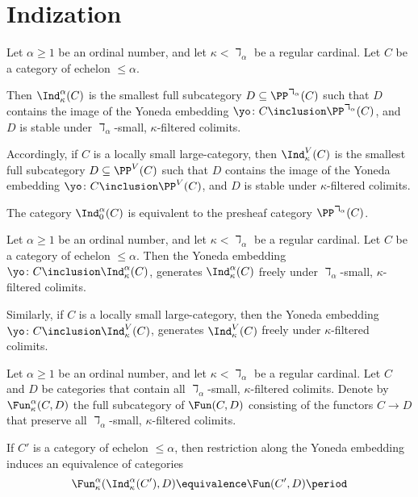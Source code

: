 
\section{Indization}%
\label{sec:indization}

\begin{definition}
	Let $ \alpha \geq 1 $ be an ordinal number, and
	let $ \kappa < \daleth_{\alpha} $ be a regular cardinal.
	Let $ C $ be a category of echelon $ \leq \alpha $.

	Then $ \Ind_{\kappa}^{\alpha}(C) $ is
	the smallest full subcategory $ D \subseteq \PP^{\daleth_{\alpha}}(C) $
	such that $ D $ contains the image
	of the Yoneda embedding
	$ \yo \colon C \inclusion \PP^{\daleth_{\alpha}}(C) $,
	and $ D $ is stable under
	$ \daleth_{\alpha} $-small, $ \kappa $-filtered colimits.

	Accordingly, if $ C $ is a locally small large-category,
	then $ \Ind_{\kappa}^V(C) $ is
	the smallest full subcategory $ D \subseteq \PP^V(C) $
	such that $ D $ contains the image
	of the Yoneda embedding
	$ \yo \colon C \inclusion \PP^V(C) $,
	and $ D $ is stable under $ \kappa $-filtered colimits.
\end{definition}

\begin{eg}
	The category $ \Ind_{0}^{\alpha}(C) $ is 
	equivalent to the presheaf category
	$ \PP^{\daleth_{\alpha}}(C) $.
\end{eg}

\begin{proposition}
	Let $ \alpha \geq 1 $ be an ordinal number, and
	let $ \kappa < \daleth_{\alpha} $ be a regular cardinal.
	Let $ C $ be a category of echelon $ \leq \alpha $.
	Then the Yoneda embedding
	$ \yo \colon C \inclusion \Ind_{\kappa}^{\alpha}(C) $,
	generates $ \Ind_{\kappa}^{\alpha}(C) $ freely under
	$ \daleth_{\alpha} $-small, $ \kappa $-filtered colimits.

	Similarly, if $ C $ is a locally small large-category,
	then the Yoneda embedding
	$ \yo \colon C \inclusion \Ind_{\kappa}^{V}(C) $,
	generates $ \Ind_{\kappa}^{V}(C) $ freely under
	$ \kappa $-filtered colimits.
\end{proposition}

\begin{nul}
	Let $ \alpha \geq 1 $ be an ordinal number, and
	let $ \kappa < \daleth_{\alpha} $ be a regular cardinal.
	Let $ C $ and $ D $  be categories
	that contain all $ \daleth_{\alpha} $-small, $ \kappa $-filtered colimits.
	Denote by $ \Fun_{\kappa}^{\alpha}(C, D) $
	the full subcategory of $ \Fun(C,D) $ consisting of
	the functors $ C \to D $ that preserve all 
	$ \daleth_{\alpha} $-small, $ \kappa $-filtered colimits.
	
	If $ C' $ is a category of echelon $ \leq \alpha $,
	then restriction along the Yoneda embedding
	induces an equivalence of categories
	\[
		\Fun_{\kappa}^{\alpha}(\Ind_{\kappa}^{\alpha}(C'), D)
		\equivalence \Fun(C', D) \period
	\]
\end{nul}

